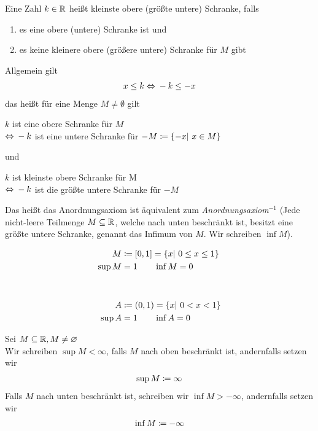 \begin{definition}
    Eine Zahl $k\in\mathbb{R}$ heißt kleinste obere (größte untere) Schranke, falls
    \begin{enumerate}
        \item es eine obere (untere) Schranke ist und
        \item es keine kleinere obere (größere untere) Schranke für $M$ gibt
    \end{enumerate}
\end{definition}

\begin{folgerung}
    \theoremescape
    Allgemein gilt
    \begin{align*}
        x \leq k \Leftrightarrow{} -k \leq -x
    \end{align*}
    das heißt für eine Menge $M\neq\emptyset$ gilt
    \begin{center}
        $k$ ist eine obere Schranke für $M$\\ $\Leftrightarrow{} -k$ ist eine untere Schranke für $-M\coloneqq\left\{-x|~x\in M\right\}$
    \end{center}
    und
    \begin{center}
        $k$ ist kleinste obere Schranke für M\\ $\Leftrightarrow{} -k$ ist die größte untere Schranke für $-M$
    \end{center}
    Das heißt das Anordnungsaxiom ist äquivalent zum \textit{Anordnungsaxiom}$^{-1}$ (Jede nicht-leere Teilmenge $M\subseteq \mathbb{R}$, welche nach unten beschränkt ist, besitzt eine größte untere Schranke, genannt das Infimum von $M$. Wir schreiben $\inf M$).
\end{folgerung}

\begin{beispiel}
    \theoremescape
    \begin{align*}
        M &\definedas \interv{0,1} = \set{x|~0\leq x \leq 1}\\
        \sup M &= 1 \qquad \inf M = 0\nn
        A &\definedas \pair{0,1} = \set{x|~0< x < 1}\\
        \sup A &= 1 \qquad \inf A = 0\\
    \end{align*}
\end{beispiel}

\begin{notation}
    Sei $M\subseteq \mathbb{R}, M\neq \varnothing$\\
    Wir schreiben $\sup M < \infty$, falls $M$ nach oben beschränkt ist, andernfalls setzen wir
    \begin{align*}
        \sup M \coloneqq \infty
    \end{align*}
    Falls $M$ nach unten beschränkt ist, schreiben wir $\inf M > -\infty$, andernfalls setzen wir
    \begin{align*}
        \inf M \coloneqq -\infty
    \end{align*}
\end{notation}

